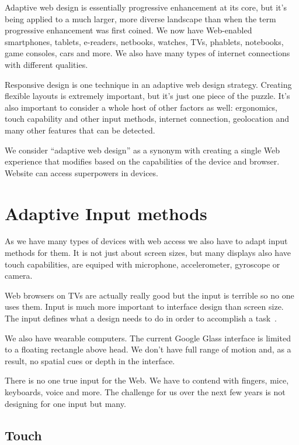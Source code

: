\documentclass{iitsrc}
\begin{document}
Adaptive web design is essentially progressive enhancement at its core, but it’s being applied to a much larger, more diverse landscape than when the term progressive enhancement was first coined. We now have Web-enabled smartphones, tablets, e-readers, netbooks, watches, TVs, phablets, notebooks, game consoles, cars and more. We also have many types of internet connections with different qualities.

Responsive design is one technique in an adaptive web design strategy. Creating flexible layouts is extremely important, but it’s just one piece of the puzzle. It’s also important to consider a whole host of other factors as well: ergonomics, touch capability and other input methods, internet connection, geolocation and many other features that can be detected.

We consider “adaptive web design” as a synonym with creating a single Web experience that modifies based on the capabilities of the device and browser. Website can access superpowers in devices.


\section{Adaptive Input methods}

As we have many types of devices with web access we also have to adapt input methods for them. It is not just about screen sizes, but many displays also have touch capabilities, are equiped with microphone, accelerometer, gyroscope or camera.

Web browsers on TVs are actually really good but the input is terrible so no one uses them. Input is much more important to interface design than screen size. The input defines what a design needs to do in order to accomplish a task~\cite{adaptiveinput}.

We also have wearable computers. The current Google Glass interface is limited to a floating rectangle above head. We don’t have full range of motion and, as a result, no spatial cues or depth in the interface.

There is no one true input for the Web. We have to contend with fingers, mice, keyboards, voice and more. The challenge for us over the next few years is not designing for one input but many.

\subsection{Touch} %
\label{sub:touch}
\end{document}

